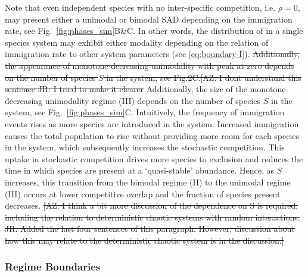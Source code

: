 \documentclass[9pt,twocolumn,twoside,lineno]{pnas-new}
\begin{document}
Note that even independent species with no inter-specific competition, i.e. $\rho=0$, may present either a unimodal or bimodal SAD depending on the immigration rate, see Fig.~\ref{fig:phases_sim}B\&C.
In other words, the distribution of in a single species system may exhibit either modality depending on the relation of immigration rate to other system parameters (see \eqref{eq:boundary-I}).
\st{Additionally, the appearance of monotone-decreasing unimodality with peak at zero depends on the number of species $S$ in the system, see Fig.2C.[AZ: I dont understand this sentence JR: I tried to make it clearer}
Additionally, the size of the monotone-decreasing unimodality regime (III) depends on the number of species $S$ in the system, see Fig.~\ref{fig:phases_sim}C.
Intuitively, the frequency of immigration events rises as more species are introduced in the system.
Increased immigration causes the total population to rise without providing more room for each species in the system, which subsequently increases the stochastic competition.
This uptake in stochastic competition drives more species to exclusion and reduces the time in which species are present at a `quasi-stable' abundance.
Hence, as $S$ increases, this transition from the bimodal regime (II) to  the unimodal regime (III) occurs at lower competitive overlap and the fraction of species present decreases.
\st{[AZ: I think a bit more discussion of the dependence on S is required, including the relation to deterministic chaotic systems with random interactions. JR: Added the last four sentences of this paragraph. However, discussion about how this may relate to the deterministic chaotic system is in the discussion.]}


\subsubsection{Regime Boundaries}
\label{sec:regime-bound}
\end{document}
